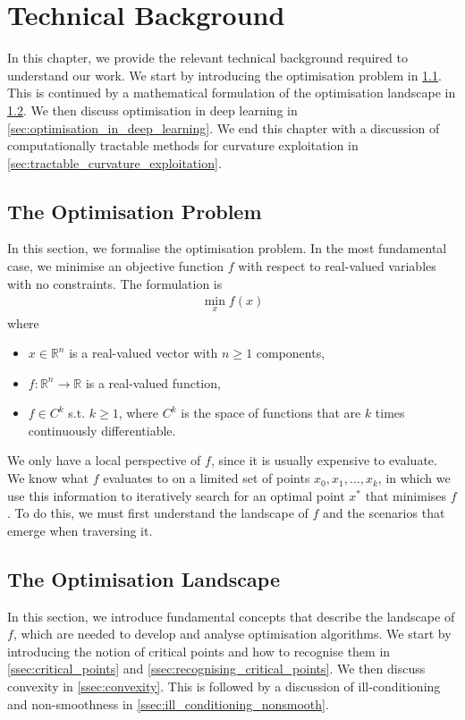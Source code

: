 \chapter{Technical Background}
\label{chap:background}

In this chapter, we provide the relevant technical background required to understand our work. We start by introducing the optimisation problem in \cref{sec:optimisation_problem}. This is continued by a mathematical formulation of the optimisation landscape in \cref{sec:optimisation_landscape}. We then discuss optimisation in deep learning in \cref{sec:optimisation_in_deep_learning}. We end this chapter with a discussion of computationally tractable methods for curvature exploitation in \cref{sec:tractable_curvature_exploitation}.

\section{The Optimisation Problem}
\label{sec:optimisation_problem}

In this section, we formalise the optimisation problem. In the most fundamental case, we minimise an objective function $f$ with respect to real-valued variables with no constraints. The formulation is 
\begin{align}
    \min_{x} f(x)
\end{align}
where
\begin{itemize}
    \item $x \in \mathbb{R}^n$ is a real-valued vector with $n \geq 1$ components,
    \item $f: \mathbb{R}^n \to \mathbb{R}$ is a real-valued function,
    \item $f \in C^k$ s.t. $k \geq 1$, where $C^k$ is the space of functions that are $k$ times continuously differentiable.
\end{itemize}
We only have a local perspective of $f$, since it is usually expensive to evaluate. We know what $f$ evaluates to on a limited set of points $x_0, x_1, \ldots, x_k$, in which we use this information to iteratively search for an optimal point $x^*$ that minimises $f$. To do this, we must first understand the landscape of $f$ and the scenarios that emerge when traversing it.

\section{The Optimisation Landscape}
\label{sec:optimisation_landscape}
In this section, we introduce fundamental concepts that describe the landscape of $f$, which are needed to develop and analyse optimisation algorithms. We start by introducing the notion of critical points and how to recognise them in \cref{ssec:critical_points} and \cref{ssec:recognising_critical_points}. We then discuss convexity in \cref{ssec:convexity}. This is followed by a discussion of ill-conditioning and non-smoothness in \cref{ssec:ill_conditioning_nonsmooth}.

